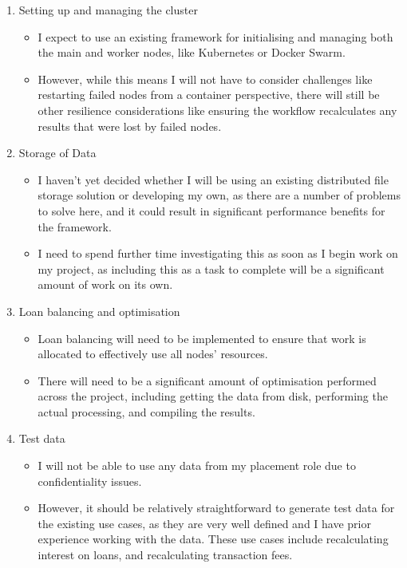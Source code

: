 \documentclass[12pt]{article}
\begin{document}
	\begin{enumerate}
		\item Setting up and managing the cluster
		\begin{itemize}
			\item I expect to use an existing framework for initialising and managing both the main and worker nodes, like Kubernetes or Docker Swarm.
			\item However, while this means I will not have to consider challenges like restarting failed nodes from a container perspective, there will still be other resilience considerations like ensuring the workflow recalculates any results that were lost by failed nodes.
		\end{itemize}
		\item Storage of Data 
		\begin{itemize}
			\item I haven't yet decided whether I will be using an existing distributed file storage solution or developing my own, as there are a number of problems to solve here, and it could result in significant performance benefits for the framework.
			\item I need to spend further time investigating this as soon as I begin work on my project, as including this as a task to complete will be a significant amount of work on its own.
		\end{itemize}
		\item Loan balancing and optimisation
		\begin{itemize}
			\item Loan balancing will need to be implemented to ensure that work is allocated to effectively use all nodes' resources.
			\item There will need to be a significant amount of optimisation performed across the project, including getting the data from disk, performing the actual processing, and compiling the results.
		\end{itemize}
		\item Test data
		\begin{itemize}
			\item I will not be able to use any data from my placement role due to confidentiality issues.
			\item However, it should be relatively straightforward to generate test data for the existing use cases, as they are very well defined and I have prior experience working with the data. These use cases include recalculating interest on loans, and recalculating transaction fees.
		\end{itemize}
	\end{enumerate}
	
\end{document}
